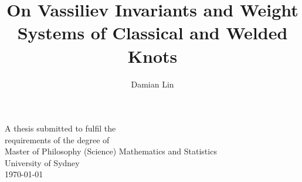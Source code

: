 \author{ \libertineDisplay Damian Lin}
\title{On Vassiliev Invariants and Weight Systems of Classical and Welded Knots}

\cleardoublepage \thispagestyle{empty}
\null \vfil
\begingroup
\LARGE \bfseries \centering
\openup \medskipamount
\thetitle \par \vspace{30pt}
\centering \mdseries \theauthor \par \bigskip
\endgroup
\vfil \vfil \vfil
\begin{center}
                A thesis submitted to fulfil the\\
                requirements of the degree of\\
                Master of Philosophy (Science)
                \vfil
                {\large Mathematics and Statistics\\[5pt]
                        University of Sydney}\\
                \vfil
                \normalsize\today
\end{center}
\vfil
\cleardoublepage
